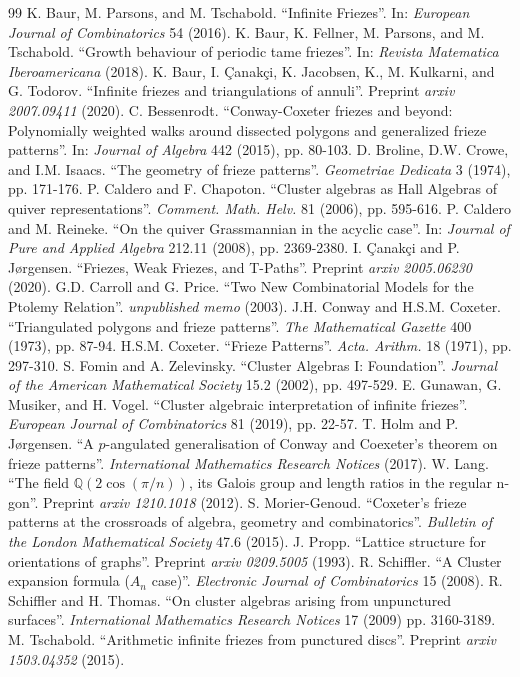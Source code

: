 \documentclass[12pt]{article}
\theoremstyle{remark}
\begin{document}
\begin{thebibliography}{99}
 K. Baur, M. Parsons, and M. Tschabold. ``Infinite Friezes''. In: \textit{European Journal of Combinatorics} 54 (2016).
  K. Baur, K. Fellner, M. Parsons, and M. Tschabold. ``Growth behaviour of periodic tame friezes''. In: \textit{Revista Matematica Iberoamericana} (2018).
 K. Baur, I. \c{C}anak\c{c}i,  K. Jacobsen, K., M. Kulkarni, and G. Todorov. ``Infinite friezes and triangulations of annuli''. Preprint \textit{arxiv 2007.09411} (2020).
 C. Bessenrodt. ``Conway-Coxeter friezes and beyond: Polynomially weighted walks around dissected polygons and generalized frieze patterns''. In: \textit{Journal of Algebra} 442 (2015), pp. 80-103. 
 D. Broline, D.W. Crowe, and I.M. Isaacs. ``The geometry of frieze patterns''. \textit{Geometriae Dedicata} 3 (1974), pp. 171-176. 
 P. Caldero and F. Chapoton. ``Cluster algebras as Hall Algebras of quiver representations''. \textit{Comment. Math. Helv.} 81 (2006), pp. 595-616. 
 P. Caldero and M. Reineke. ``On the quiver Grassmannian in the acyclic case''. In: \textit{Journal of Pure and Applied Algebra} 212.11 (2008), pp. 2369-2380. 
 I. \c{C}anak\c{c}i and P. J{\o}rgensen. ``Friezes, Weak Friezes, and T-Paths''. Preprint \textit{arxiv 2005.06230} (2020).
 G.D. Carroll and G. Price. ``Two New Combinatorial Models for the Ptolemy Relation''. \textit{unpublished memo} (2003). 
 J.H. Conway and H.S.M. Coxeter. ``Triangulated polygons and frieze patterns''. \textit{The Mathematical Gazette} 400 (1973), pp. 87-94. 
 H.S.M. Coxeter. ``Frieze Patterns''. \textit{Acta. Arithm.} 18 (1971), pp. 297-310. 
 S. Fomin and A. Zelevinsky. ``Cluster Algebras I: Foundation''. \textit{Journal of the American Mathematical Society} 15.2 (2002), pp. 497-529.
 E. Gunawan, G. Musiker, and H. Vogel. ``Cluster algebraic interpretation of infinite friezes''. \textit{European Journal of Combinatorics} 81 (2019), pp. 22-57.
 T. Holm and P. J{\o}rgensen. ``A $p$-angulated generalisation of Conway and Coexeter's theorem on frieze patterns''. \textit{International Mathematics Research Notices} (2017).
 W. Lang. ``The field $\mathbb{Q}(2\cos(\pi/n))$, its Galois group and length ratios in the regular n-gon''. Preprint \textit{arxiv 1210.1018} (2012).
 S. Morier-Genoud. ``Coxeter's frieze patterns at the crossroads of algebra, geometry and combinatorics''. \textit{Bulletin of the London Mathematical Society} 47.6 (2015).
 J. Propp. ``Lattice structure for orientations of graphs''. Preprint \textit{arxiv 0209.5005} (1993). 
 R. Schiffler. ``A Cluster expansion formula ($A_n$ case)''. \textit{Electronic Journal of Combinatorics} 15 (2008).
 R. Schiffler and H. Thomas. ``On cluster algebras arising from unpunctured surfaces''. \textit{International Mathematics Research Notices} 17 (2009) pp. 3160-3189.
 M. Tschabold. ``Arithmetic infinite friezes from punctured discs''. Preprint \textit{arxiv 1503.04352} (2015).
\end{thebibliography}
\end{document}
